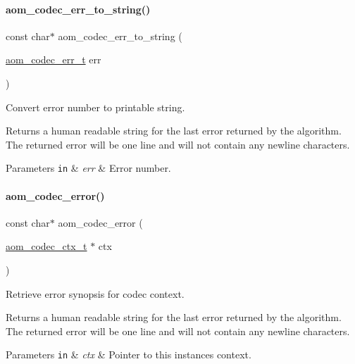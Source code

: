 \paragraph{\texorpdfstring{aom\+\_\+codec\+\_\+err\+\_\+to\+\_\+string()}{aom\_codec\_err\_to\_string()}}
{\footnotesize\ttfamily const char$\ast$ aom\+\_\+codec\+\_\+err\+\_\+to\+\_\+string (\begin{DoxyParamCaption}\item[{\hyperlink{group__codec_gaaae61e0f8663e6137f1e228757248e7c}{aom\+\_\+codec\+\_\+err\+\_\+t}}]{err }\end{DoxyParamCaption})}



Convert error number to printable string. 

Returns a human readable string for the last error returned by the algorithm. The returned error will be one line and will not contain any newline characters.


\begin{DoxyParams}[1]{Parameters}
\mbox{\tt in}  & {\em err} & Error number. \\
\hline
\end{DoxyParams}
\mbox{\label{group__codec_ga50949c0854605c722832bbfb0803f5f4}} 
\paragraph{\texorpdfstring{aom\+\_\+codec\+\_\+error()}{aom\_codec\_error()}}
{\footnotesize\ttfamily const char$\ast$ aom\+\_\+codec\+\_\+error (\begin{DoxyParamCaption}\item[{\hyperlink{group__codec_ga9a1d27f9742d9f70783e3c6cb849b5b4}{aom\+\_\+codec\+\_\+ctx\+\_\+t} $\ast$}]{ctx }\end{DoxyParamCaption})}



Retrieve error synopsis for codec context. 

Returns a human readable string for the last error returned by the algorithm. The returned error will be one line and will not contain any newline characters.


\begin{DoxyParams}[1]{Parameters}
\mbox{\tt in}  & {\em ctx} & Pointer to this instance\textquotesingle{}s context. \\
\hline
\end{DoxyParams}
\mbox{\label{group__codec_ga43a70562598b485685794a4e9d9d53f7}} 
